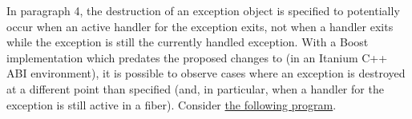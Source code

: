 \newpage
{}\label{exlife}

In  paragraph 4, the destruction of an exception
object is specified to potentially occur when an active handler for the
exception exits, not when a handler exits while the exception is still the
currently handled exception. With a Boost
implementation which predates the proposed changes to 
(in an Itanium C++ ABI environment), it is possible to observe cases where an exception is
destroyed at a different point than specified (and, in particular, when a
handler for the exception is still active in a fiber). Consider
\href{https://github.com/secondlife/3p-boost/blob/nat/exstate/tests/early_exc_destroy.cpp}{the following program}.

